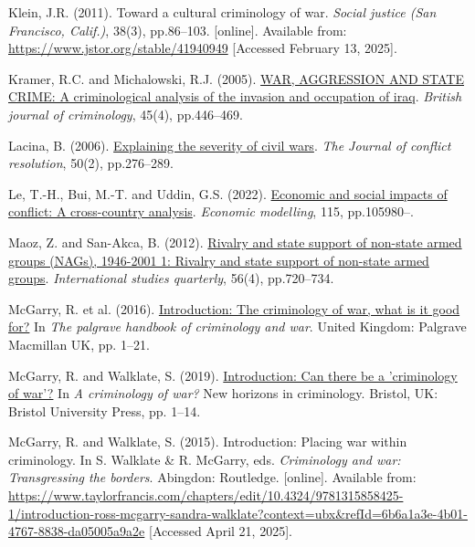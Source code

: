 \documentclass[
]{article}
\newlength{\cslhangindent}
\newenvironment{CSLReferences}[2] %
 {\begin{list}{}{%
  \setlength{\itemindent}{0pt}
  \setlength{\leftmargin}{0pt}
  \setlength{\parsep}{0pt}
  \ifodd #1
   \setlength{\leftmargin}{\cslhangindent}
   \setlength{\itemindent}{-1\cslhangindent}
  \fi
  \setlength{\itemsep}{#2\baselineskip}}}
 {\end{list}}
\begin{document}
\begin{CSLReferences}{0}{1}
Klein, J.R. (2011). Toward a cultural criminology of war. \emph{Social
justice (San Francisco, Calif.)}, 38(3), pp.86--103. {[}online{]}.
Available from: \url{https://www.jstor.org/stable/41940949} {[}Accessed
February 13, 2025{]}.

Kramer, R.C. and Michalowski, R.J. (2005).
\href{https://doi.org/10.1093/bjc/azi032}{WAR, AGGRESSION AND STATE
CRIME: A criminological analysis of the invasion and occupation of
iraq}. \emph{British journal of criminology}, 45(4), pp.446--469.

Lacina, B. (2006).
\href{https://doi.org/10.1177/0022002705284828}{Explaining the severity
of civil wars}. \emph{The Journal of conflict resolution}, 50(2),
pp.276--289.

Le, T.-H., Bui, M.-T. and Uddin, G.S. (2022).
\href{https://doi.org/10.1016/j.econmod.2022.105980}{Economic and social
impacts of conflict: A cross-country analysis}. \emph{Economic
modelling}, 115, pp.105980--.

Maoz, Z. and San-Akca, B. (2012).
\href{https://doi.org/10.1111/j.1468-2478.2012.00759.x}{Rivalry and
state support of non-state armed groups (NAGs), 1946-2001 1: Rivalry and
state support of non-state armed groups}. \emph{International studies
quarterly}, 56(4), pp.720--734.

McGarry, R. et al. (2016).
\href{https://doi.org/10.1057/978-1-137-43170-7_1}{Introduction: The
criminology of war, what is it good for?} In \emph{The palgrave handbook
of criminology and war}. United Kingdom: Palgrave Macmillan UK, pp.
1--21.

McGarry, R. and Walklate, S. (2019).
\href{https://doi.org/10.51952/9781529202618.ch001}{Introduction: Can
there be a 'criminology of war'?} In \emph{A criminology of war?} New
horizons in criminology. Bristol, UK: Bristol University Press, pp.
1--14.

McGarry, R. and Walklate, S. (2015). Introduction: Placing war within
criminology. In S. Walklate \& R. McGarry, eds. \emph{Criminology and
war: Transgressing the borders}. Abingdon: Routledge. {[}online{]}.
Available from:
\url{https://www.taylorfrancis.com/chapters/edit/10.4324/9781315858425-1/introduction-ross-mcgarry-sandra-walklate?context=ubx&refId=6b6a1a3e-4b01-4767-8838-da05005a9a2e}
{[}Accessed April 21, 2025{]}.


\end{CSLReferences}
\end{document}
